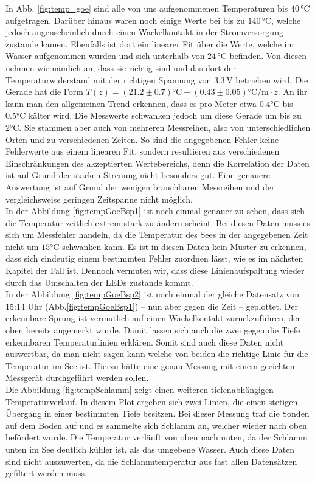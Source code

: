 \documentclass[12pt,a4paper,titlepage,headinclude,bibtotoc]{scrartcl}
\numberwithin{equation}{subsection}
\begin{document}
In Abb. \ref{fig:temp_goe} sind alle von uns aufgenommenen Temperaturen bis $40\,\si{\celsius}$ aufgetragen.
Darüber hinaus waren noch einige Werte bei bis zu $140\,\si{\celsius}$, welche jedoch augenscheinlich durch einen Wackelkontakt in der Stromversorgung zustande kamen.
Ebenfalls ist dort ein linearer Fit über die Werte, welche im Wasser aufgenommen wurden und sich unterhalb von $24\,\si{\celsius}$ befinden.
Von diesen nehmen wir nämlich an, dass sie richtig sind und das dort der Temperaturwiderstand mit der richtigen Spannung von $3.3\,$V betrieben wird.
Die Gerade hat die Form $T(z)=(21.2\pm 0.7)\si{\celsius}-(0.43\pm 0.05)\si{\celsius\per\meter}\cdot z$.
An ihr kann man den allgemeinen Trend erkennen, dass es pro Meter etwa $0.4\si{\celsius}$ bis  $0.5\si{\celsius}$  kälter wird.
Die Messwerte schwanken jedoch um diese Gerade um bis zu $2\si{\celsius}$.
Sie stammen aber auch von mehreren Messreihen, also von unterschiedlichen Orten und zu verschiedenen Zeiten.
So sind die angegebenen Fehler keine Fehlerwerte aus einem linearen Fit, sondern resultieren aus verschiedenen Einschränkungen des akzeptierten Wertebereichs, denn die Korrelation der Daten ist auf Grund der starken Streuung nicht besonders gut.
Eine genauere Auswertung ist auf Grund der wenigen brauchbaren Messreihen und der vergleichsweise geringen Zeitspanne nicht möglich.\\
In der Abbildung \ref{fig:tempGoeBsp1} ist noch einmal genauer zu sehen, dass sich die Temperatur zeitlich extrem stark zu ändern scheint.
Bei diesen Daten muss es sich um Messfehler handeln, da die Temperatur des Sees in der angegebenen Zeit nicht um $15\si\celsius$ schwanken kann.
Es ist in diesen Daten kein Muster zu erkennen, dass sich eindeutig einem bestimmten Fehler zuordnen lässt, wie es im nächsten Kapitel der Fall ist.
Dennoch vermuten wir, dass diese Linienaufspaltung wieder durch das Umschalten der LEDs zustande kommt.\\
In der Abbildung \ref{fig:tempGoeBsp2} ist noch einmal der gleiche Datensatz von 15:14 Uhr (Abb.\ref{fig:tempGoeBsp1}) -- nun aber gegen die Zeit -- geplottet.
Der erkennbare Sprung ist vermutlich auf einen Wackelkontakt zurückzuführen, der oben bereits angemerkt wurde.
Damit lassen sich auch die zwei gegen die Tiefe erkennbaren Temperaturlinien erklären.
Somit sind auch diese Daten nicht auswertbar, da man nicht sagen kann welche von beiden die richtige Linie für die Temperatur im See ist.
Hierzu hätte eine genau Messung mit einem geeichten Messgerät durchgeführt werden sollen.\\
Die Abbildung \ref{fig:tempSchlamm} zeigt einen weiteren tiefenabhängigen Temperaturverlauf.
In diesem Plot ergeben sich zwei Linien, die einen stetigen Übergang in einer bestimmten Tiefe besitzen.
Bei dieser Messung traf die Sonden auf dem Boden auf und es sammelte sich Schlamm an, welcher wieder nach oben befördert wurde.
Die Temperatur verläuft von oben nach unten, da der Schlamm unten im See deutlich kühler ist, als das umgebene Wasser.
Auch diese Daten sind nicht auszuwerten, da die Schlammtemperatur aus fast allen Datensätzen gefiltert werden muss.
\end{document}
